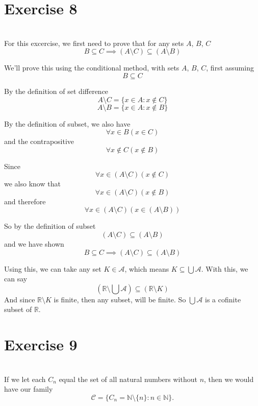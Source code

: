 \documentclass[11pt]{article}
\newcommand{\N}{\mathbb{N}}
\newcommand{\R}{\mathbb{R}}
\begin{document}
\newpage
\section*{Exercise 8}
\\

For this excercise, we first need to prove that for any sets $A$, $B$, $C$
\[B \subseteq C \implies (A\setminus C) \subseteq (A\setminus B)\]

We'll prove this using the conditional method, with sets $A$, $B$, $C$, first assuming
\[B \subseteq C\]

By the definition of set difference
\[A\setminus C = \{x\in A: x\notin C\}\]
\[A\setminus B = \{x\in A: x\notin B\}\]

By the definition of subset, we also have
\[\forall x\in B(x\in C)\]
and the contrapositive
\[\forall x\notin C(x\notin B)\]

Since
\[\forall x\in(A\setminus C)(x\notin C)\]
we also know that
\[\forall x\in(A\setminus C)(x\notin B)\]
and therefore
\[\forall x\in(A\setminus C)(x\in (A\setminus B))\]

So by the definition of subset
\[(A\setminus C) \subseteq (A\setminus B)\]
and we have shown
\[B \subseteq C \implies (A\setminus C) \subseteq (A\setminus B)\]

Using this, we can take any set $K\in\mathcal{A}$, which means $K\subseteq\bigcup\mathcal{A}$. With this, we can say
\[(\R\setminus\bigcup\mathcal{A}) \subseteq (\R\setminus K)\]
And since $\R\setminus K$ is finite, then any subset, will be finite. So $\bigcup\mathcal{A}$ is a cofinite subset of $\R$.


\section*{Exercise 9}
\\

If we let each $C_n$ equal the set of all natural numbers without $n$, then we would have our family
\[\mathcal{C} = \{C_n=\N\setminus \{n\} : n\in\N\}.\]
\end{document}
